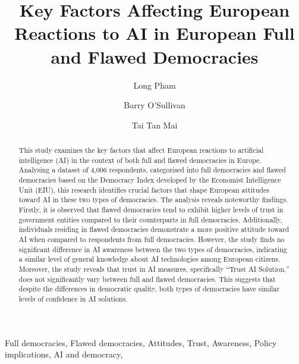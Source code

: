 \documentclass[
]{ceurart}
\begin{document}
\title{Key Factors Affecting European Reactions to AI in European Full and Flawed Democracies}
\author[1]{Long Pham}
\address[1]{Insight SFI Research Centre for Data Analytics, School of Computer Science, University College Cork, Ireland}

\author[1]{Barry O'Sullivan}
\address[2]{School of Computing, Dublin City University}

\author[2]{Tai Tan Mai}
\begin{abstract}
This study examines the key factors that affect European reactions to artificial intelligence (AI) in the context of both full and flawed democracies in Europe. Analysing a dataset of 4,006 respondents, categorised into full democracies and flawed democracies based on the Democracy Index developed by the Economist Intelligence Unit (EIU), this research identifies crucial factors that shape European attitudes toward AI in these two types of democracies. The analysis reveals noteworthy findings.
Firstly, it is observed that flawed democracies tend to exhibit higher levels of trust in government entities compared to their counterparts in full democracies. Additionally, individuals residing in flawed democracies demonstrate a more positive attitude toward AI when compared to respondents from full democracies. However, the study finds no significant difference in AI awareness between the two types of democracies, indicating a similar level of general knowledge about AI technologies among European citizens. Moreover, the study reveals that trust in AI measures, specifically ``Trust AI Solution,'' does not significantly vary between full and flawed democracies. This suggests that despite the differences in democratic quality, both types of democracies have similar levels of confidence in AI solutions.

\end{abstract}
\begin{keywords}
Full democracies,
Flawed democracies,
Attitudes,
Trust,
Awareness, 
Policy implications, 
AI and democracy, 
\end{keywords}
\maketitle
\end{document}
